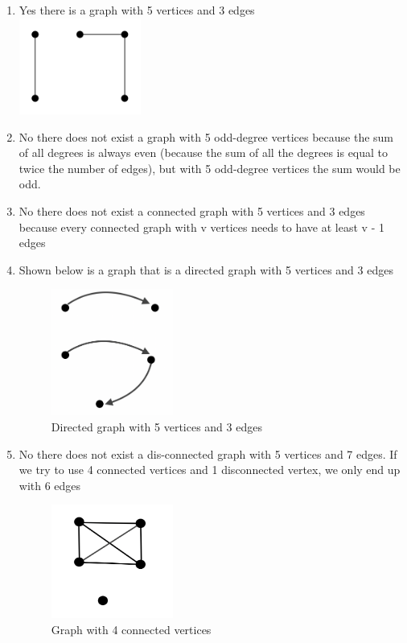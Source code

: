 \documentclass[10pt]{article}
\newenvironment{solution}[2][Solution]{ \begin{trivlist}
\item[\hskip \labelsep {\bfseries #1}]}{\end{trivlist}}
\begin{document}
\begin{solution}{3}
\item[]
\begin{enumerate}[label=(\alph*)]
\item Yes there is a graph with 5 vertices and 3 edges \\ \includegraphics[width=4cm]{graph1}
\item No there does not exist a graph with 5 odd-degree vertices because the sum of all degrees is always even (because the sum of all the degrees is equal to twice the number of edges), but with 5 odd-degree vertices the sum would be odd.
\item No there does not exist a connected graph with 5 vertices and 3 edges because every connected graph with v vertices needs to have at least v - 1 edges
\item Shown below is a graph that is a directed graph with 5 vertices and 3 edges \begin{figure}[H]
    \centering
    \caption{Directed graph with 5 vertices and 3 edges}
    \includegraphics[width=4cm]{graph7}
\end{figure}
\item \pagebreak
No there does not exist a dis-connected graph with 5 vertices and 7 edges. If we try to use 4 connected vertices and 1 disconnected vertex, we only end up with 6 edges\\
\begin{figure}[H]
    \centering
    \caption{Graph with 4 connected vertices}
    \includegraphics[width=4cm]{graph2}

\end{figure}
\end{enumerate}
\end{solution}
\end{document}
